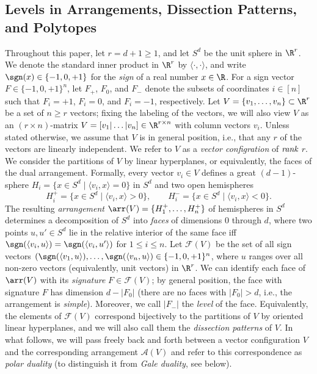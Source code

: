 \subsection{Levels in Arrangements, Dissection Patterns, and Polytopes}
\label{sec:arrangments}
Throughout this paper, let $r=d+1 \geq 1$, and let $S^d$ be the unit sphere in $\R^r$. We denote the standard inner product in $\R^r$ by $\langle\cdot ,\cdot \rangle$, and write $\sgn(x)\in \{-1,0,+1\}$ for the \emph{sign} of a real number 
$x\in \R$. %
For a sign vector $F\in \{-1,0,+1\}^n$, let $F_+$, $F_0$, and $F_-$ denote the subsets of coordinates $i\in [n]$ such that $F_i=+1$, $F_i=0$, and $F_i=-1$, respectively.
%
Let $V = \{ v_1, \ldots, v_n \} \subset \R^r$ be a set of $n\geq r$ vectors; fixing the labeling of the vectors, we will also view $V$ as an $(r\times n)$-matrix $V=[v_1|\dots|v_n] \in \R^{r\times n}$ with column vectors $v_i$. Unless stated otherwise, we assume that $V$ is in general position, i.e., that any $r$ of the vectors are linearly independent. We refer to $V$ as a \emph{vector configration} of $\emph{rank}$ $r$. 
%
We consider the partitions of $V$ by linear hyperplanes, or equivalently, the faces of the dual arrangement. Formally, every vector $v_i \in V$ defines a great $(d-1)$-sphere
$
H_i = \{ x \in S^d \mid \langle v_i, x \rangle = 0 \}
$
in $S^d$ and two open hemispheres
$$
H_i^+ = \{ x \in S^d \mid \langle v_i, x \rangle >0 \}, \qquad H_i^- = \{ x \in S^d \mid \langle v_i, x \rangle < 0 \}.
$$
The resulting \emph{arrangement} $\arr(V)=\{H_1^+,\dots,H_n^+\}$ of hemispheres in $S^d$ determines a decomposition of $S^d$ into \emph{faces} of dimensions $0$ through $d$, where two points $u,u'\in S^d$ lie in the relative interior of the same face iff $\sgn(\langle v_i,u \rangle)=\sgn(\langle v_i,u'\rangle)$ for $1\leq i\leq n$. Let $\mathcal{F}(V)$ be the set of all sign vectors $(\sgn(\langle v_1,u\rangle),\dots,\sgn(\langle v_n,u\rangle) \in \{-1,0,+1\}^n$, where $u$ ranges over all non-zero vectors (equivalently, unit vectors) in $\R^r$. We can identify each face of $\arr(V)$ with its \emph{signature} $F\in \mathcal{F}(V)$; by general position, the face with signature $F$ has dimension $d-|F_0|$ (there are no faces with $|F_0|>d$, i.e., the arrangement is \emph{simple}). Moreover, we call $|F_-|$ the \emph{level} of the face. Equivalently, the elements of $\mathcal{F}(V)$ correspond bijectively to the partitions of $V$ by oriented linear hyperplanes, and we will also call them the \emph{dissection patterns} of $V$. In what follows, we will pass freely back and forth between a vector configuration $V$ and the corresponding arrangement $\mathcal{A}(V)$ and refer to this correspondence as \emph{polar duality} (to distinguish it from \emph{Gale duality}, see below).
